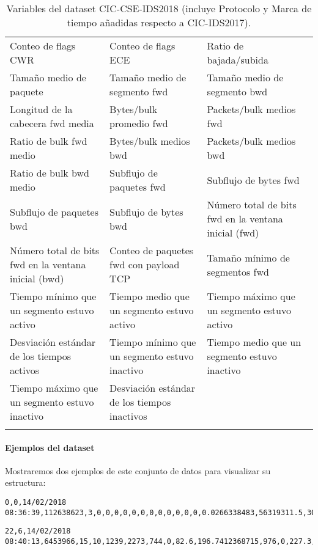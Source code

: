 \begin{longtable}{p{}p{}p{}}
Conteo de flags CWR & Conteo de flags ECE & Ratio de bajada/subida \\
Tamaño medio de paquete & Tamaño medio de segmento fwd & Tamaño medio de segmento bwd \\
Longitud de la cabecera fwd media & Bytes/bulk promedio fwd & Packets/bulk medios fwd \\
Ratio de bulk fwd medio & Bytes/bulk medios bwd & Packets/bulk medios bwd \\
Ratio de bulk bwd medio & Subflujo de paquetes fwd & Subflujo de bytes fwd \\
Subflujo de paquetes bwd & Subflujo de bytes bwd & Número total de bits fwd en la ventana inicial (fwd) \\
Número total de bits fwd en la ventana inicial (bwd) & Conteo de paquetes fwd con payload TCP & Tamaño mínimo de segmentos fwd \\
Tiempo mínimo que un segmento estuvo activo & Tiempo medio que un segmento estuvo activo & Tiempo máximo que un segmento estuvo activo \\
Desviación estándar de los tiempos activos & Tiempo mínimo que un segmento estuvo inactivo & Tiempo medio que un segmento estuvo inactivo \\
Tiempo máximo que un segmento estuvo inactivo & Desviación estándar de los tiempos inactivos & \\
\hline
\caption{Variables del dataset CIC-CSE-IDS2018 (incluye Protocolo y Marca de tiempo añadidas respecto a CIC-IDS2017).}
\label{tab:cicids2018-features}
\end{longtable}

\paragraph{Ejemplos del dataset}
Mostraremos dos ejemplos de este conjunto de datos para visualizar su estructura:

\begin{lstlisting}[style=csvline,caption={Ejemplo 1 (CIC‑CSE‑IDS2018, fila CSV abreviada)},label=List.CICIDS2018Example1]
0,0,14/02/2018 08:36:39,112638623,3,0,0,0,0,0,0,0,0,0,0,0,0,0.0266338483,56319311.5,301.9345955667,56319525,56319098,112638623,56319311.5,301.9345955667,56319525,56319098,0,0,0,0,0,0,0,0,0,0,0,0.0266338483,0,0,0,0,0,0,0,0,0,0,0,0,0,0,0,0,0,0,0,0,0,0,0,0,3,0,0,0,-1,-1,0,0,0,0,0,0,56319311.5,301.9345955667,56319525,56319098,Benign
\end{lstlisting}

\begin{lstlisting}[style=csvline,caption={Ejemplo 2 (CIC‑CSE‑IDS2018, fila CSV abreviada)},label=List.CICIDS2018Example2]
22,6,14/02/2018 08:40:13,6453966,15,10,1239,2273,744,0,82.6,196.7412368715,976,0,227.3,371.6778922072,544.1615279659,3.8735871865,268915.25,247443.778966007,673900,22,6453966,460997.571428571,123109.423587757,673900,229740,5637902,626433.555555556,455082.21422401,1167293,554,0,0,0,0,488,328,2.3241523119,1.5494348746,0,976,135.0769230769,277.8347599674,77192.1538461539,0,0,0,1,0,0,0,0,0,140.48,82.6,227.3,0,0,0,0,0,0,15,1239,10,2273,65535,233,6,32,0,0,0,0,0,0,0,0,Benign
\end{lstlisting}

